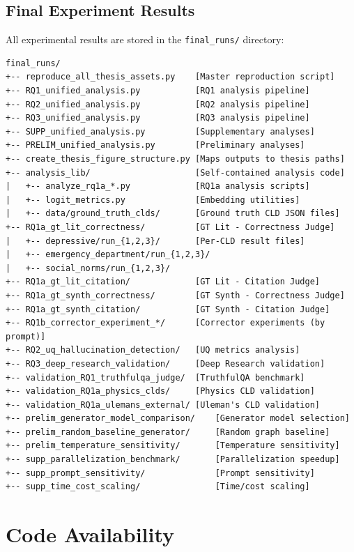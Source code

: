 \subsection{Final Experiment Results}

All experimental results are stored in the \texttt{final\_runs/} directory:

\begin{verbatim}
final_runs/
+-- reproduce_all_thesis_assets.py    [Master reproduction script]
+-- RQ1_unified_analysis.py           [RQ1 analysis pipeline]
+-- RQ2_unified_analysis.py           [RQ2 analysis pipeline]
+-- RQ3_unified_analysis.py           [RQ3 analysis pipeline]
+-- SUPP_unified_analysis.py          [Supplementary analyses]
+-- PRELIM_unified_analysis.py        [Preliminary analyses]
+-- create_thesis_figure_structure.py [Maps outputs to thesis paths]
+-- analysis_lib/                     [Self-contained analysis code]
|   +-- analyze_rq1a_*.py             [RQ1a analysis scripts]
|   +-- logit_metrics.py              [Embedding utilities]
|   +-- data/ground_truth_clds/       [Ground truth CLD JSON files]
+-- RQ1a_gt_lit_correctness/          [GT Lit - Correctness Judge]
|   +-- depressive/run_{1,2,3}/       [Per-CLD result files]
|   +-- emergency_department/run_{1,2,3}/
|   +-- social_norms/run_{1,2,3}/
+-- RQ1a_gt_lit_citation/             [GT Lit - Citation Judge]
+-- RQ1a_gt_synth_correctness/        [GT Synth - Correctness Judge]
+-- RQ1a_gt_synth_citation/           [GT Synth - Citation Judge]
+-- RQ1b_corrector_experiment_*/      [Corrector experiments (by prompt)]
+-- RQ2_uq_hallucination_detection/   [UQ metrics analysis]
+-- RQ3_deep_research_validation/     [Deep Research validation]
+-- validation_RQ1_truthfulqa_judge/  [TruthfulQA benchmark]
+-- validation_RQ1a_physics_clds/     [Physics CLD validation]
+-- validation_RQ1a_ulemans_external/ [Uleman's CLD validation]
+-- prelim_generator_model_comparison/    [Generator model selection]
+-- prelim_random_baseline_generator/     [Random graph baseline]
+-- prelim_temperature_sensitivity/       [Temperature sensitivity]
+-- supp_parallelization_benchmark/       [Parallelization speedup]
+-- supp_prompt_sensitivity/              [Prompt sensitivity]
+-- supp_time_cost_scaling/               [Time/cost scaling]
\end{verbatim}

\section{Code Availability}
\label{sec:code_availability}

